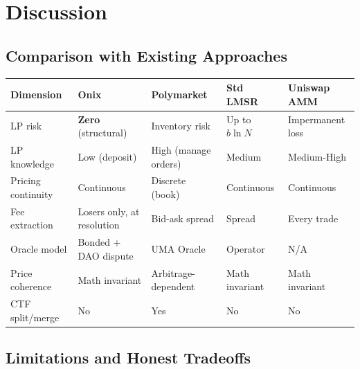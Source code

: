 \documentclass{ledger}
\theoremstyle{plain}
\theoremstyle{remark}
\begin{document}
\section{Discussion}\label{sec:discussion}

\subsection{Comparison with Existing Approaches}

\begin{center}
\begin{tabular}{lllll}
\hline
\textbf{Dimension} & \textbf{Onix} & \textbf{Polymarket} & \textbf{Std LMSR} & \textbf{Uniswap AMM} \\
\hline
LP risk & \textbf{Zero} (structural) & Inventory risk & Up to $b \ln N$ & Impermanent loss \\
LP knowledge & Low (deposit) & High (manage orders) & Medium & Medium-High \\
Pricing continuity & Continuous & Discrete (book) & Continuous & Continuous \\
Fee extraction & Losers only, at resolution & Bid-ask spread & Spread & Every trade \\
Oracle model & Bonded + DAO dispute & UMA Oracle & Operator & N/A \\
Price coherence & Math invariant & Arbitrage-dependent & Math invariant & Math invariant \\
CTF split/merge & No & Yes & No & No \\
\hline
\end{tabular}
\end{center}

\subsection{Limitations and Honest Tradeoffs}\label{sec:limitations}
\end{document}
